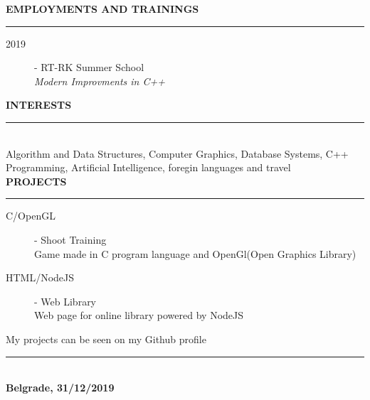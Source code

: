 \documentclass{article}
\begin{document}
\textbf{\large EMPLOYMENTS AND TRAININGS}\\
\color{my_col}\noindent\rule{15.4cm}{0.6pt}\color{black}
\begin{description}
    \item[ 2019] - RT-RK Summer School \\
    \textit{Modern Improvments in C++}
   
\end{description}

\textbf{\large INTERESTS}\\
\color{my_col}\noindent\rule{15.4cm}{0.6pt}\color{black}\\
Algorithm and Data Structures, Computer Graphics, Database Systems, 
C++ Programming, Artificial Intelligence, foregin languages and travel\\

\textbf{\large PROJECTS}\\
\color{my_col}\noindent\rule{15.4cm}{0.6pt}\color{black}
\begin{description}
    \item[ C/OpenGL] - Shoot Training\\ 
    Game made in C program language and OpenGl(Open Graphics Library)
    \item[ HTML/NodeJS] - Web Library\\ 
    Web page for online library powered by NodeJS
\end{description}
My projects can be seen on my Github profile \\

\color{my_col}\noindent\rule{15.4cm}{0.6pt}\color{black}\\
\textbf{\large Belgrade, 31/12/2019}\\
\end{document}
